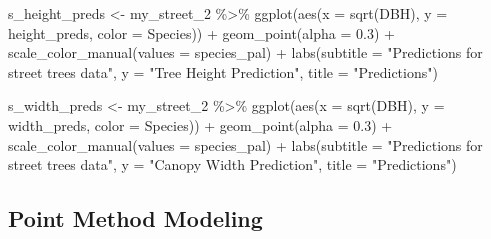 \documentclass[12pt,twoside]{reedthesis}
\newenvironment{Shaded}{\begin{snugshade}}{\end{snugshade}}
\newcommand{\AttributeTok}[1]{\textcolor[rgb]{0.77,0.63,0.00}{#1}}
\newcommand{\FloatTok}[1]{\textcolor[rgb]{0.00,0.00,0.81}{#1}}
\newcommand{\FunctionTok}[1]{\textcolor[rgb]{0.00,0.00,0.00}{#1}}
\newcommand{\NormalTok}[1]{#1}
\newcommand{\OtherTok}[1]{\textcolor[rgb]{0.56,0.35,0.01}{#1}}
\newcommand{\SpecialCharTok}[1]{\textcolor[rgb]{0.00,0.00,0.00}{#1}}
\newcommand{\StringTok}[1]{\textcolor[rgb]{0.31,0.60,0.02}{#1}}
\begin{document}
\begin{Shaded}
\begin{Highlighting}[]
\NormalTok{s\_height\_preds }\OtherTok{\textless{}{-}}\NormalTok{ my\_street\_2 }\SpecialCharTok{\%\textgreater{}\%}
    \FunctionTok{ggplot}\NormalTok{(}\FunctionTok{aes}\NormalTok{(}\AttributeTok{x =} \FunctionTok{sqrt}\NormalTok{(DBH), }\AttributeTok{y =}\NormalTok{ height\_preds, }\AttributeTok{color =}\NormalTok{ Species)) }\SpecialCharTok{+}
    \FunctionTok{geom\_point}\NormalTok{(}\AttributeTok{alpha =} \FloatTok{0.3}\NormalTok{) }\SpecialCharTok{+} \FunctionTok{scale\_color\_manual}\NormalTok{(}\AttributeTok{values =}\NormalTok{ species\_pal) }\SpecialCharTok{+}
    \FunctionTok{labs}\NormalTok{(}\AttributeTok{subtitle =} \StringTok{"Predictions for street trees data"}\NormalTok{, }\AttributeTok{y =} \StringTok{"Tree Height Prediction"}\NormalTok{,}
        \AttributeTok{title =} \StringTok{"Predictions"}\NormalTok{)}

\NormalTok{s\_width\_preds }\OtherTok{\textless{}{-}}\NormalTok{ my\_street\_2 }\SpecialCharTok{\%\textgreater{}\%}
    \FunctionTok{ggplot}\NormalTok{(}\FunctionTok{aes}\NormalTok{(}\AttributeTok{x =} \FunctionTok{sqrt}\NormalTok{(DBH), }\AttributeTok{y =}\NormalTok{ width\_preds, }\AttributeTok{color =}\NormalTok{ Species)) }\SpecialCharTok{+}
    \FunctionTok{geom\_point}\NormalTok{(}\AttributeTok{alpha =} \FloatTok{0.3}\NormalTok{) }\SpecialCharTok{+} \FunctionTok{scale\_color\_manual}\NormalTok{(}\AttributeTok{values =}\NormalTok{ species\_pal) }\SpecialCharTok{+}
    \FunctionTok{labs}\NormalTok{(}\AttributeTok{subtitle =} \StringTok{"Predictions for street trees data"}\NormalTok{, }\AttributeTok{y =} \StringTok{"Canopy Width Prediction"}\NormalTok{,}
        \AttributeTok{title =} \StringTok{"Predictions"}\NormalTok{)}
\end{Highlighting}
\end{Shaded}
\hypertarget{point-method-modeling}{%
\subsection*{Point Method Modeling}\label{point-method-modeling}}
\end{document}
